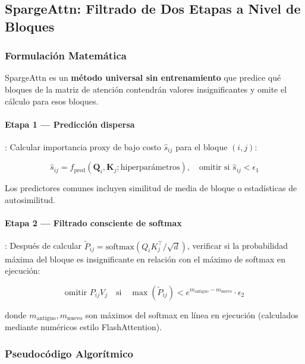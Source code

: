 \documentclass[11pt,a4paper]{article}
\begin{document}
\subsection{SpargeAttn: Filtrado de Dos Etapas a Nivel de Bloques}

\subsubsection{Formulación Matemática}

SpargeAttn \citep{zhang_spargeattn_2025} es un \textbf{método universal sin entrenamiento} que predice qué bloques de la matriz de atención contendrán valores insignificantes y omite el cálculo para esos bloques.

\paragraph{Etapa 1 --- Predicción dispersa}: Calcular importancia proxy de bajo costo $\hat{s}_{ij}$ para el bloque $(i,j)$:

\[
\hat{s}_{ij} = f_{\text{pred}}(\mathbf{Q}_i, \mathbf{K}_j; \text{hiperparámetros}), \quad \text{omitir si } \hat{s}_{ij} < \epsilon_1
\]

Los predictores comunes incluyen similitud de media de bloque o estadísticas de autosimilitud.

\paragraph{Etapa 2 --- Filtrado consciente de softmax}: Después de calcular $\tilde{P}_{ij} = \text{softmax}(Q_i K_j^\top/\sqrt{d})$, verificar si la probabilidad máxima del bloque es insignificante en relación con el máximo de softmax en ejecución:

\[
\text{omitir } P_{ij} V_j \quad \text{si} \quad \max(\tilde{P}_{ij}) < e^{m_{\text{antiguo}} - m_{\text{nuevo}}} \cdot \epsilon_2
\]

donde $m_{\text{antiguo}}, m_{\text{nuevo}}$ son máximos del softmax en línea en ejecución (calculados mediante numéricos estilo FlashAttention).

\subsubsection{Pseudocódigo Algorítmico}
\end{document}
